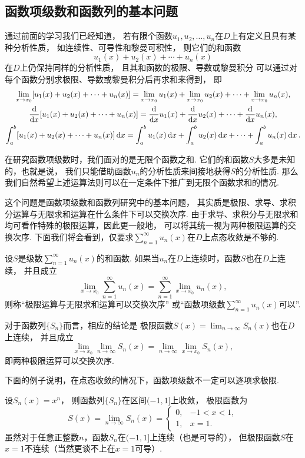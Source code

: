 \subsection{函数项级数和函数列的基本问题}
通过前面的学习我们已经知道，
若有限个函数\(u_1,u_2,\dotsc,u_n\)在\(D\)上有定义且具有某种分析性质，
如连续性、可导性和黎曼可积性，
则它们的和函数\[
	u_1(x) + u_2(x) + \dotsb + u_n(x)
\]在\(D\)上仍保持同样的分析性质，
且其和函数的极限、导数或黎曼积分
可以通过对每个函数分别求极限、导数或黎曼积分后再求和来得到，
即\begin{gather*}
	\lim_{x \to x_0} [u_1(x) + u_2(x) + \dotsb + u_n(x)]
	= \lim_{x \to x_0} u_1(x)
	+ \lim_{x \to x_0} u_2(x)
	+ \dotsb
	+ \lim_{x \to x_0} u_n(x), \\
	\dv{x} [u_1(x) + u_2(x) + \dotsb + u_n(x)]
	= \dv{x} u_1(x)
	+ \dv{x} u_2(x)
	+ \dotsb
	+ \dv{x} u_n(x), \\
	\int_a^b [u_1(x) + u_2(x) + \dotsb + u_n(x)] \dd{x}
	= \int_a^b u_1(x) \dd{x}
	+ \int_a^b u_2(x) \dd{x}
	+ \dotsb
	+ \int_a^b u_n(x) \dd{x}.
\end{gather*}

在研究函数项级数时，我们面对的是无限个函数之和.
它们的和函数\(S\)大多是未知的，也就是说，
我们只能借助函数\(u_n\)的分析性质来间接地获得\(S\)的分析性质.
那么我们自然希望上述运算法则可以在一定条件下推广到无限个函数求和的情况.

这个问题是函数项级数和函数列研究中的基本问题，
其实质是极限、求导、求积分运算与无限求和运算在什么条件下可以交换次序.
由于求导、求积分与无限求和均可看作特殊的极限运算，因此更一般地，
可以将其统一视为两种极限运算的交换次序.
下面我们将会看到，仅要求\(\sum_{n=1}^\infty u_n(x)\)在\(D\)上点态收敛是不够的.

\begin{definition}
设\(S\)是级数\(\sum_{n=1}^\infty u_n(x)\)的和函数.
如果当\(u_n\)在\(D\)上连续时，函数\(S\)也在\(D\)上连续，
并且成立\[
	\lim_{x \to x_0} \sum_{n=1}^\infty u_n(x)
	= \sum_{n=1}^\infty \lim_{x \to x_0} u_n(x),
\]
则称“极限运算与无限求和运算可以交换次序”
或“函数项级数\(\sum_{n=1}^\infty u_n(x)\)可以”.
\end{definition}
对于函数列\(\{S_n\}\)而言，相应的结论是
极限函数\(S(x) = \lim_{n\to\infty} S_n(x)\)也在\(D\)上连续，
并且成立\[
	\lim_{x \to x_0} \lim_{n\to\infty} S_n(x)
	= \lim_{n\to\infty} \lim_{x \to x_0} S_n(x),
\]
即两种极限运算可以交换次序.

下面的例子说明，在点态收敛的情况下，函数项级数不一定可以逐项求极限.
\begin{example}\label{example:函数项级数.点态收敛情况下和函数可能不连续}
设\(S_n(x) = x^n\)，
则函数列\(\{S_n\}\)在区间\((-1,1]\)上收敛，
极限函数为\[
	S(x) = \lim_{n\to\infty} S_n(x)
	= \left\{ \begin{array}{ll}
		0, & -1<x<1, \\
		1, & x=1.
	\end{array} \right.
\]
虽然对于任意正整数\(n\)，函数\(S_n\)在\((-1,1]\)上连续（也是可导的），
但极限函数\(S\)在\(x=1\)不连续（当然更谈不上在\(x=1\)可导）.
\end{example}


